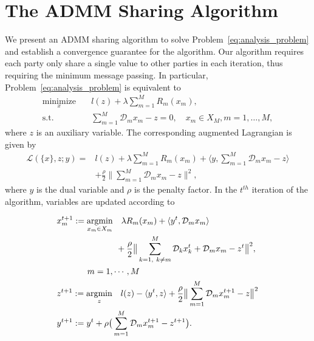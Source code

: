 \section{The ADMM Sharing Algorithm}
\label{sec:admmSharing}
We present an ADMM sharing algorithm \cite{boyd2011distributed,hong2016convergence} to solve Problem~\eqref{eq:analysis_problem} and establish a convergence guarantee for the algorithm. Our algorithm requires each party only share a single value to other parties in each iteration, thus requiring the minimum message passing. 
In particular, Problem~\eqref{eq:analysis_problem} is equivalent to
\begin{align}
\underset{x}{\text{minimize}} &\quad l\left(z\right) + \lambda\sum_{m=1}^{M} R_m(x_m),\\
\text{s.t.} &\quad \sum_{m=1}^{M} \mathcal{D}_m x_m - z = 0,\quad x_m\in X_M, m=1,\ldots,M,
\end{align}
where $z$ is an auxiliary variable. 
The corresponding augmented Lagrangian is given by
\begin{align}
\mathcal{L}(\{x\}, z; y) =& l(z) + \lambda\sum_{m=1}^{M} R_m(x_m) + \langle y, \sum_{m=1}^{M}\mathcal{D}_m x_m - z\rangle \nonumber\\
    &+ \frac{\rho}{2}\|\sum_{m=1}^{M} \mathcal{D}_m x_m - z\|^2, \label{eq:lagragian}
\end{align}
where $y$ is the dual variable and $\rho$ is the penalty factor.
In the $t^{th}$ iteration of the algorithm, variables are updated according to

\begin{align}
&x_m^{t+1}:=\underset{x_m\in X_m}{\text{argmin}}\quad\lambda R_m(x_m) + \langle y^t, \mathcal{D}_mx_m\rangle\nonumber\\
& \quad\quad\quad\quad\quad\quad\quad+ \frac{\rho}{2}\big\|\sum_{\substack{k=1,~k\neq m}}^{M}\mathcal{D}_kx_k^{t} + \mathcal{D}_mx_m - z^t\big\|^2, \nonumber\\
&\hspace*{36pt} m=1,\cdots,M\label{eq:pal_algo_x}\\
&z^{t+1}:=\underset{z}{\text{argmin}}\quad l(z)  - \langle y^t, z \rangle + \frac{\rho}{2} \big\|\sum_{m=1}^{M}\mathcal{D}_mx_m^{t+1} - z\big\|^2\label{eq:pal_algo_z}\\
&y^{t+1}:=y^t + \rho\big(\sum_{m=1}^{M}\mathcal{D}_mx_m^{t+1} - z^{t+1}\big).\label{eq:pal_algo_y}
\end{align}

